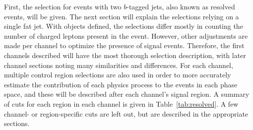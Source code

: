First, the selection for events with two $b$-tagged jets,
also known as resolved events, will be given.
The next section will explain the selections relying on a single fat jet.
With objects defined, the selections differ mostly in counting the number
of charged leptons present in the event.
However, other adjustments are made per channel to optimize the presence of signal events.
Therefore, the first channels described will have the most thorough selection description,
with later channel sections noting many similarities and differences.
For each channel,
multiple control region selections are also used in order to more accurately
estimate the contribution of each physics process to the events in each phase space,
and these will be described after each channel's signal region.
A summary of cuts for each region in each channel
is given in Table~\ref{tab:resolved}.
A few channel- or region-specific cuts are left out,
but are described in the appropriate sections.

